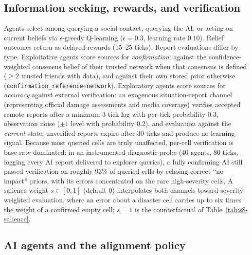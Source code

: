 \documentclass[11pt]{article}
\begin{document}
\subsection{Information seeking, rewards, and verification}

Agents select among querying a social contact, querying the AI, or acting
on current beliefs via $\epsilon$-greedy Q-learning ($\epsilon = 0.3$,
learning rate $0.10$). Relief outcomes return as delayed rewards (15--25
ticks). Report evaluations differ by type. Exploitative agents score
sources for \emph{confirmation}: against the confidence-weighted
consensus belief of their trusted network when that consensus is defined
($\geq 2$ trusted friends with data), and against their own stored prior
otherwise (\texttt{confirmation\_reference=network}). Exploratory agents
score sources for \emph{accuracy} against external verification: an
exogenous situation-report channel (representing official damage
assessments and media coverage) verifies accepted remote reports after a
minimum 3-tick lag with per-tick probability 0.3, observation noise
($\pm 1$ level with probability 0.2), and evaluation against the
\emph{current} state; unverified reports expire after 30 ticks and
produce no learning signal. Because most queried cells are truly
unaffected, per-cell verification is base-rate dominated: in an
instrumented diagnostic probe (40 agents, 80 ticks, logging every AI
report delivered to explorer queries), a fully confirming AI still
passed verification on roughly 93\% of queried cells by echoing correct
``no impact'' priors, with its errors concentrated on the rare
high-severity cells. A salience weight $s \in [0,1]$
(default 0) interpolates both channels toward severity-weighted
evaluation, where an error about a disaster cell carries up to six times
the weight of a confirmed empty cell; $s = 1$ is the counterfactual of
Table~\ref{tab:s8-salience}.

\subsection{AI agents and the alignment policy}
\end{document}

